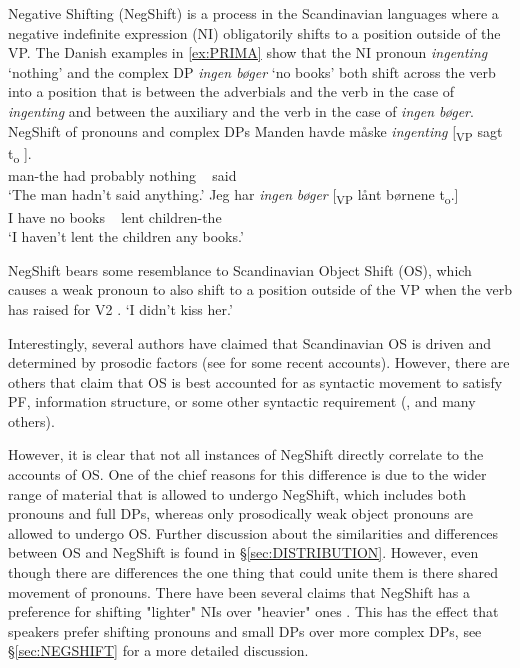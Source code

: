\documentclass[12pt, letterpaper]{article}
\begin{document}
Negative Shifting (NegShift) is a process in the Scandinavian languages where a negative indefinite expression (NI) obligatorily shifts to a position outside of the VP. The Danish examples in \ref{ex:PRIMA} show that the NI pronoun \textit{ingenting} `nothing' and the complex DP \textit{ingen bøger} `no books' both shift across the verb into a position that is between the adverbials and the verb in the case of \textit{ingenting} and between the auxiliary and the verb in the case of \textit{ingen bøger}.
	\ea NegShift of pronouns and complex DPs\label{ex:PRIMA}
		\ea
		\gll Manden havde måske \textit{ingenting} [\textsubscript{VP} sagt t\textsubscript{o} ].\\
		man-the had probably nothing ~ said\\
		\glt `The man hadn't said anything.'
		\ex 
		\gll Jeg har \textit{ingen} \textit{bøger} [\textsubscript{VP} lånt børnene t\textsubscript{o}.]\\
		I have no books ~ lent children-the\\
		\glt `I haven't lent the children any books.'
		\z
	\z 

NegShift bears some resemblance to Scandinavian Object Shift (OS), which causes a weak pronoun to also shift to a position outside of the VP when the verb has raised for V2 \citep{holmbergWordOrderSyntactic1986,holmbergRemarksHolmbergGeneralization1999}.
	 
	\glt `I didn't kiss her.' \label{ex:OS}  
	\z  

Interestingly, several authors have claimed that Scandinavian OS is driven and determined by prosodic factors (see \cite{erteschik-shirSoundPatternsSyntax2005,erteschik-shirScandinavianObjectShift2017,erteschik-shirVariationMainlandScandinavian2019,brinkerhoffMATCHINGPhrasesNorwegian2020} for some recent accounts). However, there are others that claim that OS is best accounted for as syntactic movement to satisfy PF, information structure, or some other syntactic requirement (\cite{holmbergRemarksHolmbergGeneralization1999,thrainssonObjectShiftScrambling2001,bentzenObjectShiftSpoken2013,sichelFeaturalLifeNominals2020}, and many others). 

However, it is clear that not all instances of NegShift directly correlate to the accounts of OS. One of the chief reasons for this difference is due to the wider range of material that is allowed to undergo NegShift, which includes both pronouns and full DPs, whereas only prosodically weak object pronouns are allowed to undergo OS. Further discussion about the similarities and differences between OS and NegShift is found in §\ref{sec:DISTRIBUTION}. However, even though there are differences the one thing that could unite them is there shared movement of pronouns. There have been several claims that NegShift has a preference for shifting "lighter" NIs over "heavier" ones \citep{christensenInterfacesNegationSyntax2005,penkaNegativeIndefinites2011}. This has the effect that speakers prefer shifting pronouns and small DPs over more complex DPs, see §\ref{sec:NEGSHIFT} for a more detailed discussion.
\end{document}
